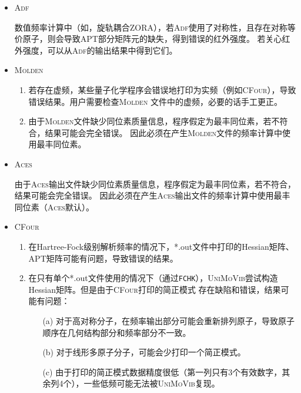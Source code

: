 \documentclass[12pt,a4paper,openany,twoside,cap,UTF8]{ctexbook}
\begin{document}
\begin{itemize}
\item \textsc{Adf}

数值频率计算中（如，旋轨耦合ZORA），若\textsc{Adf}使用了对称性，且存在对称等价原子，则会导致APT部分矩阵元的缺失，得到错误的红外强度。
若关心红外强度，可以从\textsc{Adf}的输出结果中得到它们。

\item \textsc{Molden}

\begin{enumerate}
\item 若存在虚频，某些量子化学程序会错误地打印为实频（例如\textsc{CFour}），导致错误结果。用户需要检查\textsc{Molden}
文件中的虚频，必要的话手工更正。

\item 由于\textsc{Molden}文件缺少同位素质量信息，程序假定为最丰同位素，若不符合，结果可能会完全错误。
因此必须在产生\textsc{Molden}文件的频率计算中使用最丰同位素。
\end{enumerate}

\item \textsc{Aces}

由于\textsc{Aces}输出文件缺少同位素质量信息，程序假定为最丰同位素，若不符合，结果可能会完全错误。
因此必须在产生\textsc{Aces}输出文件的频率计算中使用最丰同位素（\textsc{Aces}默认）。

\item \textsc{CFour}

\begin{enumerate}
\item 在Hartree-Fock级别解析频率的情况下，*.out文件中打印的Hessian矩阵、APT矩阵可能有问题，导致错误的结果。

\item 在只有单个*.out文件使用的情况下（通过\verb|FCHK|），\textsc{UniMoVib}尝试构造Hessian矩阵。但是由于\textsc{CFour}打印的简正模式
存在缺陷和错误，结果可能有问题：
  \begin{itemize}
    \item[(a)] 对于高对称分子，在频率输出部分可能会重新排列原子，导致原子顺序在几何结构部分和频率部分不一致。
    \item[(b)] 对于线形多原子分子，可能会少打印一个简正模式。
    \item[(c)] 由于打印的简正模式数据精度很低（第一列只有3个有效数字，其余列4个），一些低频可能无法被\textsc{UniMoVib}复现。
  \end{itemize}
\end{enumerate}

\end{itemize}
\end{document}
